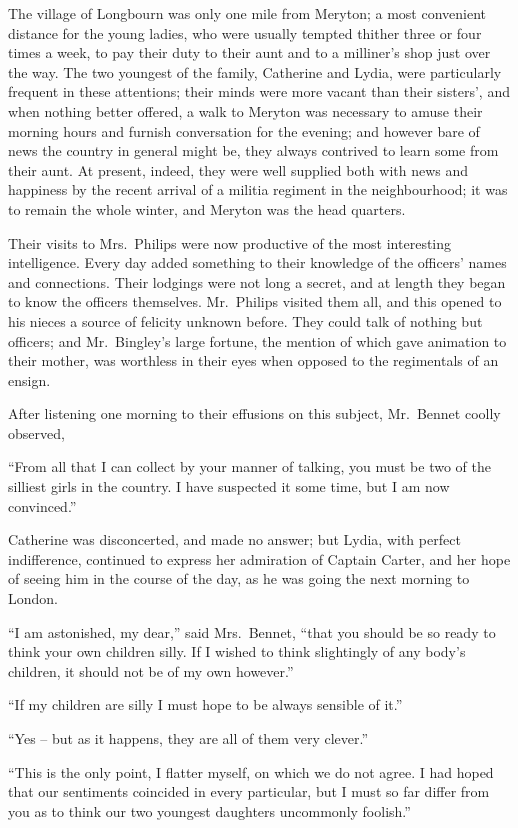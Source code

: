 The village of Longbourn was only one mile from
Meryton; a most convenient distance for the young
ladies, who were usually tempted thither three or four
times a week, to pay their duty to their aunt and to a
milliner’s shop just over the way. The two youngest
of the family, Catherine and Lydia, were particularly
frequent in these attentions; their minds were more
vacant than their sisters’, and when nothing better offered,
a walk to Meryton was necessary to amuse their morning
hours and furnish conversation for the evening; and
however bare of news the country in general might be,
they always contrived to learn some from their aunt.
At present, indeed, they were well supplied both with news
and happiness by the recent arrival of a militia regiment
in the neighbourhood; it was to remain the whole winter,
and Meryton was the head quarters.

Their visits to Mrs.\ Philips were now productive of
the most interesting intelligence. Every day added
something to their knowledge of the officers’ names and
connections. Their lodgings were not long a secret, and
at length they began to know the officers themselves.
Mr.\ Philips visited them all, and this opened to his nieces
a source of felicity unknown before. They could talk of
nothing but officers; and Mr.\ Bingley’s large fortune,
the mention of which gave animation to their mother,
was worthless in their eyes when opposed to the regimentals
of an ensign.

After listening one morning to their effusions on this
subject, Mr.\ Bennet coolly observed,

“From all that I can collect by your manner of talking,
you must be two of the silliest girls in the country. I have
suspected it some time, but I am now convinced.”

Catherine was disconcerted, and made no answer; but
Lydia, with perfect indifference, continued to express her
admiration of Captain Carter, and her hope of seeing him
in the course of the day, as he was going the next morning
to London.

“I am astonished, my dear,” said Mrs.\ Bennet, “that
you should be so ready to think your own children silly.
If I wished to think slightingly of any body’s children,
it should not be of my own however.”

“If my children are silly I must hope to be always
sensible of it.”

“Yes -- but as it happens, they are all of them very
clever.”

“This is the only point, I flatter myself, on which we
do not agree. I had hoped that our sentiments coincided
in every particular, but I must so far differ from you
as to think our two youngest daughters uncommonly
foolish.”

